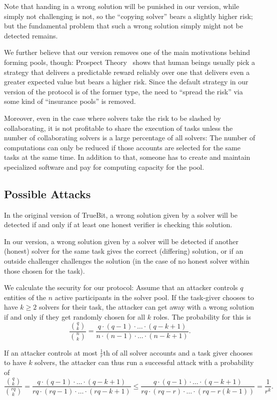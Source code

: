 \documentclass[a4paper]{article}
\begin{document}
Note that handing in a wrong solution will be punished in our version, while simply not challenging is not, so the ``copying solver'' bears a slightly higher risk; but the fundamental problem that such a wrong solution simply might not be detected remains. 

We further believe that our version removes one of the main motivations behind forming pools, though: Prospect Theory~\cite{KahnemanTversky} shows that human beings usually pick a strategy that delivers a predictable reward reliably over one that delivers even a greater expected value but bears a higher risk. Since the default strategy in our version of the protocol is of the former type, the need to ``spread the risk'' via some kind of ``insurance pools'' is removed. 

Moreover, even in the case where solvers take the risk to be slashed by collaborating,
it is not profitable to share the execution of tasks unless
the number of collaborating solvers is a large percentage of all solvers:
The number of computations can only be reduced if
those accounts are selected for the same tasks at the same time.
In addition to that, someone has to
create and maintain specialized software and pay for computing capacity for the pool.


\subsection{Possible Attacks}

In the original version of TrueBit, a wrong solution given by a solver
will be detected if and only if at least one honest verifier is checking this solution. 

In our version, a wrong solution given by a solver will be detected if another
(honest) solver for the same task gives the correct (differing) solution, or
if an outside challenger challenges the solution (in the case of no honest solver
within those chosen for the task). 

We calculate the security for our protocol: Assume that an attacker controls $q$
entities of the $n$ active participants in the solver pool. If the task-giver
chooses to have $k\geq 2$ solvers for their task, the attacker can get away with
a wrong solution if and only if they get randomly chosen for all $k$ roles. The probability for this is
\[\frac{\binom{q}{k}}{\binom{n}{k}} = \frac{q\cdot(q-1)\cdot\dots\cdot(q-k+1)}{n\cdot(n-1)\cdot\dots\cdot(n-k+1)}.\]

If an attacker controls at most $\frac1r$th of all solver accounts and a task giver chooses to have $k$ solvers, the attacker can thus run a successful attack with a probability of
\[\frac{\binom{q}{k}}{\binom{rq}{k}} = \frac{q\cdot(q-1)\cdot\dots\cdot(q-k+1)}{rq\cdot(rq-1)\cdot\dots\cdot(rq-k+1)}\leq
\frac{q\cdot(q-1)\cdot\dots\cdot(q-k+1)}{rq\cdot(rq-r)\cdot\dots\cdot(rq-r(k-1))} =\frac{1}{r^k}
.\]
\end{document}
